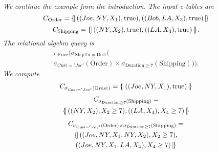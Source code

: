 \begin{example}\em
We continue the example from the introduction. The input c-tables are
\[
C_{\mathrm{Order}} = \{\!|\, ((Joe, NY, X_1), \mbox{true}),
((Bob, LA, X_3), \mbox{true}) \,|\!\}
\]
\[
C_{\mathrm{Shipping}} = \{\!|\, ((NY, X_2), \mbox{true}),
   ((LA, X_4), \mbox{true}) \,|\!\}.
\]
The relational algebra query is
\begin{multline*}
\pi_{\mathrm{Price}}(\sigma_{\mathrm{ShipTo} = \mathrm{Dest}}( \\
\sigma_{\mathrm{Cust}='Joe'}(\mathrm{Order}) \times
\sigma_{\mathrm{Duration} \ge 7}(\mathrm{Shipping}))).
\end{multline*}
%
We compute
\begin{multline*}
C_{\sigma_{\mathrm{Cust}='Joe'}(\mathrm{Order})} = \{\!|\, ((Joe, NY, X_1), \mbox{true})
\,|\!\}
\end{multline*}
\vspace*{-0.35in}
\begin{multline*}
C_{\sigma_{\mathrm{Duration} \ge 7}(\mathrm{Shipping})} =\\
\{\!|\, ((NY, X_2), X_2 \ge 7), ((LA, X_4),X_4 \ge 7) \,|\!\}
\end{multline*}
\vspace*{-0.35in}
\begin{multline*}
C_{\sigma_{\mathrm{Cust}='Joe'}(\mathrm{Order}) \times
\sigma_{\mathrm{Duration} \ge 7}(\mathrm{Shipping})} = \\
\{\!|\, ((Joe, NY, X_1, NY, X_2), X_2 \ge 7),\\
((Joe, NY, X_1, LA, X_4), 
X_4 \ge 7) \,|\!\}
\end{multline*}
\punto
\end{example}


